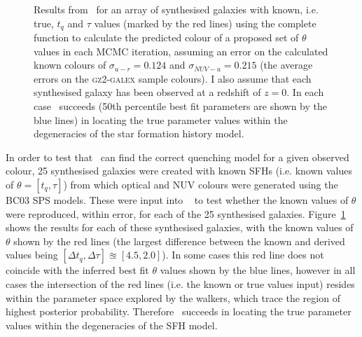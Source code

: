 \begin{figure}
\caption[Testing \starpy]{Results from \starpy ~for an array of synthesised galaxies with known, i.e. true, $t_q$ and $\tau$ values (marked by the red lines) using the complete function to calculate the predicted colour of a proposed set of $\theta$ values in each MCMC iteration, assuming an error on the calculated known colours of $\sigma_{u-r} = 0.124$ and $\sigma_{NUV-u} = 0.215$ (the average errors on the \textsc{gz2-galex} sample colours). I also assume that each synthesised galaxy has been observed at a redshift of $z=0$. In each case \starpy ~succeeds (50th percentile best fit parameters are shown by the blue lines) in locating the true parameter values within the degeneracies of the star formation history model.}
\label{test_mosaic}
\end{figure}

In order to test that \starpy ~can find the correct quenching model for a given observed colour, 25 synthesised galaxies were created with known SFHs (i.e. known values of $\theta = [t_q, \tau]$) from which optical and NUV colours were generated using the BC03 SPS models. These were input into \starpy ~ to test whether the known values of $\theta$ were reproduced, within error, for each of the 25 synthesised galaxies. Figure~\ref{test_mosaic} shows the results for each of these synthesised galaxies, with the known values of $\theta$ shown by the red lines (the largest difference between the known and derived values being $[\Delta t_q, \Delta \tau] \approxeq [4.5, 2.0]$). In some cases this red line does not coincide with the inferred best fit $\theta$ values shown by the blue lines, however in all cases the intersection of the red lines (i.e. the known or true values input) resides within the parameter space explored by the walkers, which trace the region of highest posterior probability. Therefore \starpy\ succeeds in locating the true parameter values within the degeneracies of the SFH model. 

